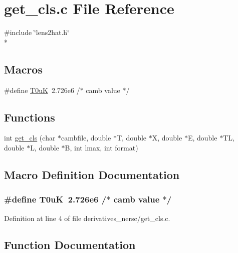 \section{get\-\_\-cls.\-c File Reference}
\label{derivatives__nersc_2get__cls_8c}
{\ttfamily \#include \char`\"{}lens2hat.\-h\char`\"{}}\\*
\subsection*{Macros}
\begin{DoxyCompactItemize}
\item 
\#define \hyperlink{derivatives__nersc_2get__cls_8c_a08cd9bfd4b050dde02e833f33461b671}{T0u\-K}~2.\-726e6           /$\ast$ camb value $\ast$/
\end{DoxyCompactItemize}
\subsection*{Functions}
\begin{DoxyCompactItemize}
\item 
int \hyperlink{derivatives__nersc_2get__cls_8c_af9a60e15f3021cfb6634c159b19507f5}{get\-\_\-cls} (char $\ast$cambfile, double $\ast$T, double $\ast$X, double $\ast$E, double $\ast$T\-L, double $\ast$L, double $\ast$B, int lmax, int format)
\end{DoxyCompactItemize}


\subsection{Macro Definition Documentation}
\subsubsection[{T0u\-K}]{\setlength{\rightskip}{0pt plus 5cm}\#define T0u\-K~2.\-726e6           /$\ast$ camb value $\ast$/}\label{derivatives__nersc_2get__cls_8c_a08cd9bfd4b050dde02e833f33461b671}


Definition at line 4 of file derivatives\-\_\-nersc/get\-\_\-cls.\-c.



\subsection{Function Documentation}
